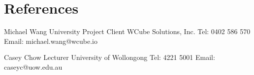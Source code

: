 \section{References}

\bgroup\obeylines

\begin{flushleft}
Michael Wang 
University Project Client
WCube Solutions, Inc.
Tel: 0402 586 570
Email: michael.wang@wcube.io
\end{flushleft}

\begin{flushleft}
Casey Chow 
Lecturer
University of Wollongong
Tel: 4221 5001
Email: caseyc@uow.edu.au
\end{flushleft}
